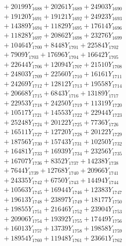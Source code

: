 \documentclass[a4paper,10pt]{article}
\begin{document}
{\begin{align}
&\;  + 20199 Y_{1688} + 20261 Y_{1689} + 24903 Y_{1690} \\[0.3ex]
&\;  + 19120 Y_{1691} + 19121 Y_{1692} + 24923 Y_{1693} \\[0.3ex]
&\;  + 14389 Y_{1694} + 11829 Y_{1695} + 17614 Y_{1696} \\[0.3ex]
&\;  + 11828 Y_{1697} + 20862 Y_{1698} + 23276 Y_{1699} \\[0.3ex]
&\;  + 10464 Y_{1700} + 8448 Y_{1701} + 22584 Y_{1702} \\[0.3ex]
&\;  + 7909 Y_{1703} + 17696 Y_{1704} + 16642 Y_{1705} \\[0.3ex]
&\;  + 22644 Y_{1706} + 12094 Y_{1707} + 21510 Y_{1708} \\[0.5ex]\allowbreak
&\;  + 24803 Y_{1709} + 22560 Y_{1710} + 16161 Y_{1711} \\[0.3ex]
&\;  + 24269 Y_{1712} + 12812 Y_{1713} + 19558 Y_{1714} \\[0.3ex]
&\;  + 20668 Y_{1715} + 6843 Y_{1716} + 13189 Y_{1717} \\[0.3ex]
&\;  + 22953 Y_{1718} + 24250 Y_{1719} + 11319 Y_{1720} \\[0.3ex]
&\;  + 10517 Y_{1721} + 14553 Y_{1722} + 22944 Y_{1723} \\[0.3ex]
&\;  + 25248 Y_{1724} + 20122 Y_{1725} + 7736 Y_{1726} \\[0.3ex]
&\;  + 16511 Y_{1727} + 12720 Y_{1728} + 20122 Y_{1729} \\[0.3ex]
&\;  + 18756 Y_{1730} + 15743 Y_{1731} + 10250 Y_{1732} \\[0.3ex]
&\;  + 16481 Y_{1733} + 16939 Y_{1734} + 23256 Y_{1735} \\[0.3ex]
&\;  + 16707 Y_{1736} + 8352 Y_{1737} + 14238 Y_{1738} \\[0.5ex]\allowbreak
&\;  + 7644 Y_{1739} + 12768 Y_{1740} + 20966 Y_{1741} \\[0.3ex]
&\;  + 24335 Y_{1742} + 6750 Y_{1743} + 14494 Y_{1744} \\[0.3ex]
&\;  + 10563 Y_{1745} + 16944 Y_{1746} + 12383 Y_{1747} \\[0.3ex]
&\;  + 19613 Y_{1748} + 23897 Y_{1749} + 18177 Y_{1750} \\[0.3ex]
&\;  + 19855 Y_{1751} + 21646 Y_{1752} + 23904 Y_{1753} \\[0.3ex]
&\;  + 20906 Y_{1754} + 19392 Y_{1755} + 17449 Y_{1756} \\[0.3ex]
&\;  + 16013 Y_{1757} + 13739 Y_{1758} + 19858 Y_{1759} \\[0.3ex]
&\;  + 18954 Y_{1760} + 11948 Y_{1761} + 23661 Y_{1762} \\[0.3ex]

\end{align}}
\end{document}
